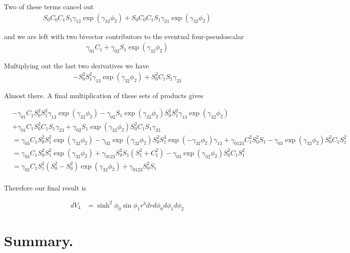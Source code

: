 Two of these terms cancel out
\begin{align*}
S_0 C_0 C_1 S_1 \gamma_{12} \exp( \gamma_{32} \phi_2 ) 
+S_0 C_0 C_1 S_1 \gamma_{21} \exp( \gamma_{32} \phi_2 ) 
\end{align*}

and we are left with two bivector contributors to the eventual four-pseudoscalar
\begin{align*}
\gamma_{01} C_1 
+\gamma_{02} S_1 \exp( \gamma_{32} \phi_2 ) 
\end{align*}

Multiplying out the last two derivatives we have
\begin{align*}
-S_0^2 S_1^2 \gamma_{13} \exp( \gamma_{32} \phi_2 )
+ S_0^2 C_1 S_1 \gamma_{23}
\end{align*}

Almost there.  A final multiplication of these sets of products gives

\begin{align*}
&-\gamma_{01} C_1 S_0^2 S_1^2 \gamma_{13} \exp( \gamma_{32} \phi_2 )
-\gamma_{02} S_1 \exp( \gamma_{32} \phi_2 ) S_0^2 S_1^2 \gamma_{13} \exp( \gamma_{32} \phi_2 ) \\
&+\gamma_{01} C_1 S_0^2 C_1 S_1 \gamma_{23}
+\gamma_{02} S_1 \exp( \gamma_{32} \phi_2 ) S_0^2 C_1 S_1 \gamma_{23} \\
&=
\gamma_{03} C_1 S_0^2 S_1^2 \exp( \gamma_{32} \phi_2 )
-\gamma_{02} \exp( \gamma_{32} \phi_2 ) S_0^2 S_1^3 \exp( -\gamma_{32} \phi_2 ) \gamma_{13}
+\gamma_{0123} C_1^2 S_0^2 S_1 
-\gamma_{03} \exp( \gamma_{32} \phi_2 ) S_0^2 C_1 S_1^2 \\
&=
\gamma_{03} C_1 S_0^2 S_1^2 \exp( \gamma_{32} \phi_2 )
+\gamma_{0123} S_0^2 S_1 (S_1^2 + C_1^2)
-\gamma_{03} \exp( \gamma_{32} \phi_2 ) S_0^2 C_1 S_1^2 \\
&=
\gamma_{03} C_1 S_1^2 (S_0^2 -S_0^2)\exp( \gamma_{32} \phi_2 )
+\gamma_{0123} S_0^2 S_1  \\
\end{align*}

Therefore our final result is

\begin{align*}
dV_4 &= \sinh^2 \phi_0 \sin\phi_1 r^3 dr d\phi_0 d\phi_1 d\phi_2
\end{align*}

\section{Summary. }

